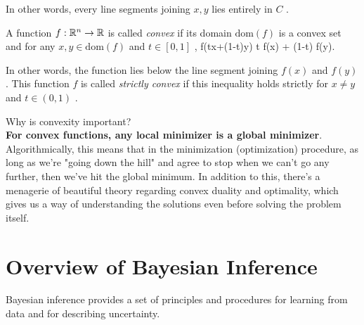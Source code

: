In other words, every line segments joining  $x,y$  lies entirely in  $C$ .

A function $f:\mathbb{R}^n \rightarrow \mathbb{R}$ is called \emph{convex} if its domain $\text{dom}(f)$  is a convex set and for any  $x,y\in \text{dom}(f)$  and $ t\in[0,1]$ ,
\bse 
f(tx+(1-t)y) \leq t f(x) + (1-t) f(y).
\ese 

In other words, the function lies below the line segment joining $ f(x)$  and $ f(y)$ . This function  $f$  is called \emph{strictly convex} if this inequality holds strictly for  $x \neq y$  and  $t \in (0,1)$ .
\begin{mybox}{}
Why is convexity important? \\
\textbf{For convex functions, any local minimizer is a global minimizer}. Algorithmically, this means that in the minimization (optimization) procedure, as long as we're "going down the hill" and agree to stop when we can't go any further, then we've hit the global minimum. In addition to this, there's a menagerie of beautiful theory regarding convex duality and optimality, which gives us a way of understanding the solutions even before solving the problem itself.
\end{mybox}


\section{Overview of Bayesian Inference}
\label{sec:bayes}
Bayesian inference provides a set of principles and procedures for learning from data and for describing uncertainty.
